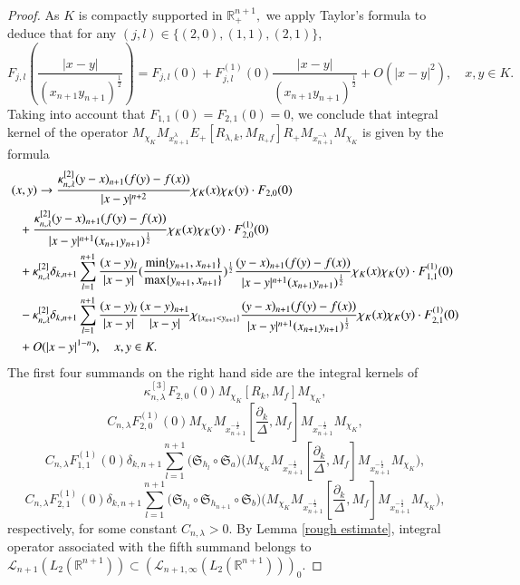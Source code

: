 \documentclass[12pt]{amsart}
\begin{document}
\begin{proof}
As $K$ is compactly supported in $\mathbb{R}^{n+1}_+,$ we apply Taylor's formula to deduce that for any $(j,l)\in \{(2,0),(1,1),(2,1)\}$,
$$F_{j,l}(\frac{|x-y|}{(x_{n+1}y_{n+1})^{\frac12}})=F_{j,l}(0)+F_{j,l}^{(1)}(0)\frac{|x-y|}{(x_{n+1}y_{n+1})^{\frac12}}+O(|x-y|^2),\quad x,y\in K.$$
Taking into account that $F_{1,1}(0)=F_{2,1}(0)=0$, we conclude that integral kernel of the operator $M_{\chi_K} M_{x_{n+1}^{\lambda}}E_+[R_{\lambda,k},M_{R_+f}]R_+M_{x_{n+1}^{-\lambda}} M_{\chi_K}$ is given by the formula
\begin{align*}
(x,y)&\to\frac{\kappa^{[2]}_{n,\lambda}(y-x)_{n+1}(f(y)-f(x))}{|x-y|^{n+2}}\chi_K(x)\chi_K(y)\cdot F_{2,0}(0)\\
&\hspace{-0.5cm}+\frac{\kappa^{[2]}_{n,\lambda}(y-x)_{n+1}(f(y)-f(x))}{|x-y|^{n+1}(x_{n+1}y_{n+1})^{\frac12}}\chi_K(x)\chi_K(y)\cdot F_{2,0}^{(1)}(0)\\
&\hspace{-0.5cm}+\kappa^{[2]}_{n,\lambda}\delta_{k,n+1}\sum_{l=1}^{n+1} \frac{(x-y)_l}{|x-y|}(\frac{\min\{y_{n+1},x_{n+1}\}}{\max\{y_{n+1},x_{n+1}\}})^{\frac12} \frac{(y-x)_{n+1}(f(y)-f(x))}{|x-y|^{n+1}(x_{n+1}y_{n+1})^{\frac12}}\chi_K(x)\chi_K(y)\cdot F_{1,1}^{(1)}(0)\\
&\hspace{-0.5cm}-\kappa^{[2]}_{n,\lambda}\delta_{k,n+1}\sum_{l=1}^{n+1} \frac{(x-y)_l}{|x-y|}\frac{(x-y)_{n+1}}{|x-y|}\chi_{\{x_{n+1}<y_{n+1}\}} \frac{(y-x)_{n+1}(f(y)-f(x))}{|x-y|^{n+1}(x_{n+1}y_{n+1})^{\frac12}}\chi_K(x)\chi_K(y)\cdot F_{2,1}^{(1)}(0)\\
&\hspace{-0.5cm}+O(|x-y|^{1-n}),\quad x,y\in K.
\end{align*}
The first four summands on the right hand side are the integral kernels of
$$\kappa^{[3]}_{n,\lambda}F_{2,0}(0)M_{\chi_K}[R_k,M_f]M_{\chi_K},$$
$$C_{n,\lambda}F_{2,0}^{(1)}(0)M_{\chi_K}M_{x_{n+1}^{-\frac12}}[\frac{\partial_k}{\Delta},M_f]M_{x_{n+1}^{-\frac12}}M_{\chi_K},$$
$$C_{n,\lambda}F_{1,1}^{(1)}(0)\delta_{k,n+1}\sum_{l=1}^{n+1}\Big(\mathfrak{S}_{h_l}\circ\mathfrak{S}_a\Big)\Big(M_{\chi_K}M_{x_{n+1}^{-\frac12}}[\frac{\partial_k}{\Delta},M_f]M_{x_{n+1}^{-\frac12}}M_{\chi_K}\Big),$$
$$C_{n,\lambda}F_{2,1}^{(1)}(0)\delta_{k,n+1}\sum_{l=1}^{n+1}\Big(\mathfrak{S}_{h_l}\circ\mathfrak{S}_{h_{n+1}}\circ\mathfrak{S}_b\Big)\Big(M_{\chi_K}M_{x_{n+1}^{-\frac12}}[\frac{\partial_k}{\Delta},M_f]M_{x_{n+1}^{-\frac12}}M_{\chi_K}\Big),$$
respectively, for some constant $C_{n,\lambda}>0$. By Lemma \ref{rough estimate}, integral operator associated with the fifth summand belongs to  $\mathcal{L}_{n+1}(L_2(\mathbb{R}^{n+1}))\subset (\mathcal{L}_{n+1,\infty}(L_2(\mathbb{R}^{n+1})))_0.$


\end{proof}
\end{document}
